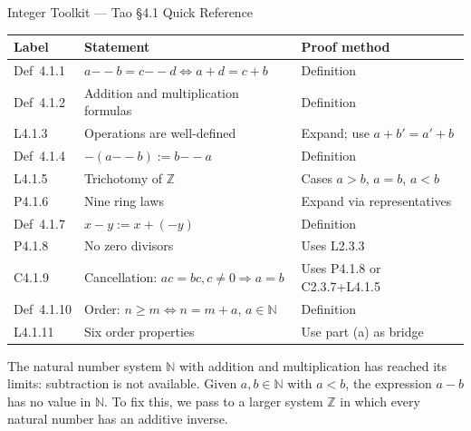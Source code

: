 
\begin{toolkitbox}{Integer Toolkit — Tao §4.1 Quick Reference}
\small
\begin{tabular}{l l l}
\toprule
\textbf{Label} & \textbf{Statement} & \textbf{Proof method} \\
\midrule
Def~4.1.1   & $a{-\!\!-}b = c{-\!\!-}d \iff a+d=c+b$ & Definition \\
Def~4.1.2   & Addition and multiplication formulas & Definition \\
L4.1.3      & Operations are well-defined & Expand; use $a+b'=a'+b$ \\
Def~4.1.4   & $-(a{-\!\!-}b) := b{-\!\!-}a$ & Definition \\
L4.1.5      & Trichotomy of $\mathbb{Z}$ & Cases $a>b$, $a=b$, $a<b$ \\
P4.1.6      & Nine ring laws & Expand via representatives \\
Def~4.1.7   & $x - y := x + (-y)$ & Definition \\
P4.1.8      & No zero divisors & Uses L2.3.3 \\
C4.1.9      & Cancellation: $ac=bc, c\neq 0 \Rightarrow a=b$ & Uses P4.1.8 or C2.3.7+L4.1.5 \\
Def~4.1.10  & Order: $n \geq m \iff n = m+a$, $a \in \mathbb{N}$ & Definition \\
L4.1.11     & Six order properties & Use part (a) as bridge \\
\bottomrule
\end{tabular}
\end{toolkitbox}

\begin{remark*}
The natural number system $\mathbb{N}$ with addition and multiplication
has reached its limits: subtraction is not available.
Given $a, b \in \mathbb{N}$ with $a < b$, the expression $a - b$ has
no value in $\mathbb{N}$. To fix this, we pass to a larger system $\mathbb{Z}$
in which every natural number has an additive inverse.
\end{remark*}

